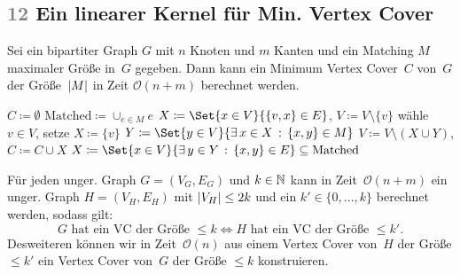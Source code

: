 \documentclass{cheat-sheet}
\newcommand{\size}[1]{\abs{#1}} %
\DeclareMathOperator*{\argmin}{arg\,min}
\newcommand{\Powerset}{\mathcal{P}} %
\renewcommand{\O}{\mathcal{O}} %
\DeclareMathOperator{\Neighbors}{Neighbors} %
\newcommand{\IndentState}[1]{\State \quad #1}
\newcommand{\Problem}[1]{\textcolor{ProblemColor}{\textbf{#1}}}
\newcommand{\scriptSection}[1]{\textcolor{gray}{#1}\enspace}
\begin{document}
\subsection{\scriptSection{12} Ein linearer Kernel für \Problem{Min. Vertex Cover}}

\begin{resultat}
  Sei ein bipartiter Graph $G$ mit $n$ Knoten und $m$ Kanten und ein Matching $M$ maximaler Größe in~$G$ gegeben.
  Dann kann ein Minimum Vertex Cover~$C$ von~$G$ der Größe~$\size{M}$ in Zeit $\O(n+m)$ berechnet werden.
\end{resultat}

\begin{algorithmic}
  \State $C \coloneqq \emptyset$
  \State $\mathrm{Matched} \coloneqq \cup_{e \in M} e$
      \State $X \coloneqq \Set{x \in V}{\{ v, x \} \in E}$, \enspace $V \coloneqq V \setminus \{ v \}$
    \Else \enspace
      wähle $v \in V$, setze $X \coloneqq \{ v \}$
    \EndIf
      \State $Y \coloneqq \Set{y \in V}{\ex{x \in X} \{ x, y \} \in M}$
      \State $V \coloneqq V \setminus (X \cup Y)$, \enspace $C \coloneqq C \cup X$
      \State $X \coloneqq \Set{x \in V}{\ex{y \in Y} \{ x, y \} \in E} \subseteq \mathrm{Matched}$
    \EndWhile
  \EndWhile
\end{algorithmic}

\begin{satz}
  Für jeden unger. Graph $G = (V_G, E_G)$ und $k \in \mathbb{N}$ kann in Zeit~$\O(n+m)$ ein unger. Graph $H = (V_H, E_H)$ mit $\size{V_H} \leq 2 k$ und ein $k' \in \{ 0, \ldots, k \}$ berechnet werden, sodass gilt:
  \[
    \text{$G$ hat ein VC der Größe $\leq k$} \iff
    \text{$H$ hat ein VC der Größe $\leq k'$}.
  \]
  Desweiteren können wir in Zeit~$\O(n)$ aus einem Vertex Cover von~$H$ der Größe $\leq k'$ ein Vertex Cover von~$G$ der Größe $\leq k$ konstruieren.
\end{satz}
\end{document}
